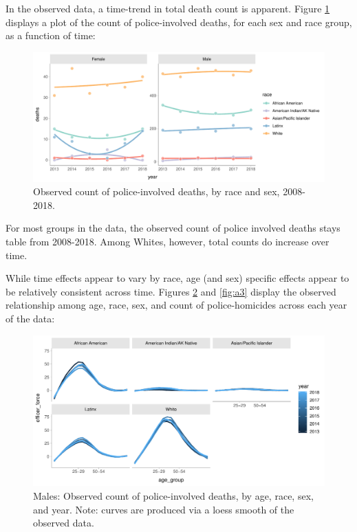 \documentclass{article}
\begin{document}
In the observed data, a time-trend in total death count is apparent. Figure \ref{fig:a1} displays a plot of the count of police-involved deaths, for each sex and race group, as a function of time: 

\begin{figure}[H]
	\centering
	\includegraphics[width = \linewidth]{vis/fig_a1.pdf}
	\caption{Observed count of police-involved deaths, by race and sex, 2008-2018.}
	\label{fig:a1}
\end{figure}

For most groups in the data, the observed count of police involved deaths stays table from 2008-2018. Among Whites, however, total counts do increase over time. 

While time effects appear to vary by race, age (and sex) specific effects appear to be relatively consistent across time. Figures \ref{fig:a2} and \ref{fig:a3} display the observed relationship among age, race, sex, and count of police-homicides across each year of the data:

\begin{figure}
	\centering
	\includegraphics[width = \linewidth]{vis/fig_a2.pdf}
	\caption{Males: Observed count of police-involved deaths, by age, race, sex, and year. Note: curves are produced via a loess smooth of the observed data.}
	\label{fig:a2}
\end{figure}
\end{document}
